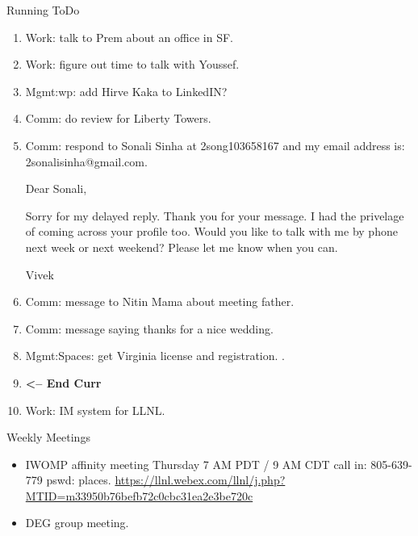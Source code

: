 \begin{columns}
\begin{column}{0.5\linewidth}
\begin{block}{Running ToDo}
\begin{enumerate}
          \item \tiny Work: talk to Prem about an office in SF. 
          \item \tiny Work: figure out time to talk with Youssef.
          \item \tiny Mgmt:wp: add Hirve Kaka to LinkedIN?

          \item \tiny Comm: do review for Liberty Towers.

          \item \tiny Comm: respond to Sonali Sinha at 2song103658167
            and my email address is: 2sonalisinha@gmail.com.

            Dear Sonali,

            Sorry for my delayed reply. Thank you for your message. I had
            the privelage of coming across your profile too. Would
            you like to talk with me by phone next week or next weekend? 
            Please let me know when you can.
            
            Vivek

          \item \tiny Comm: message to Nitin Mama about meeting father.
          \item \tiny Comm: message saying thanks for a nice wedding.
          \item \tiny Mgmt:Spaces: get Virginia license and
            registration. .
  
\item \tiny \textbf{ <-- End Curr } 

\item \tiny Work: IM system for LLNL. 

        \end{enumerate}
      \end{block}
 

      \begin{block}{Weekly Meetings}
        \begin{itemize}
          \tiny \item \tiny IWOMP affinity meeting Thursday 7 AM PDT / 9 AM
          CDT call in: 805-639-779 pswd: places. \url{https://llnl.webex.com/llnl/j.php?MTID=m33950b76befb72c0cbc31ea2e3be720c}
        \item \tiny DEG group meeting.  
        \end{itemize}
      \end{block} 



\end{column}
\end{columns}

